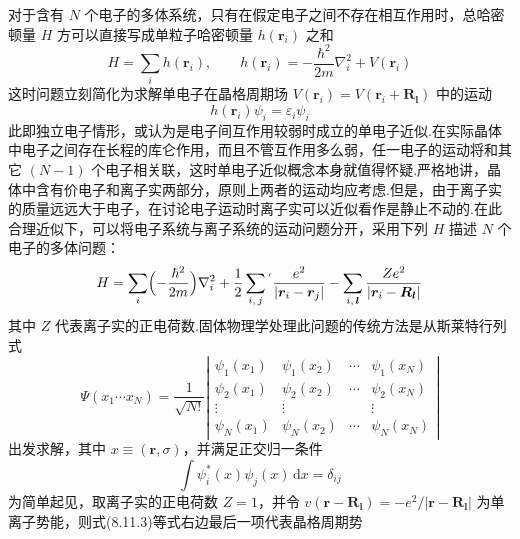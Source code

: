 对于含有 $N$ 个电子的多体系统，只有在假定电子之间不存在相互作用时，总哈密顿量 $H$ 方可以直接写成单粒子哈密顿量 $h(\boldsymbol{r}_{i})$ 之和
\begin{equation}
  H=\sum_{i}h(\boldsymbol{r}_{i}),\qquad
  h(\boldsymbol{r}_{i})=-\frac{\hbar^{2}}{2m}\nabla_{i}^{2}+V(\boldsymbol{r}_{i})
\end{equation}
这时问题立刻简化为求解单电子在晶格周期场 $V(\boldsymbol{r}_{i})=V(\boldsymbol{r}_{i}+\boldsymbol{R}_{\boldsymbol{l}})$ 中的运动
\begin{equation}
  h(\boldsymbol{r}_{i})\psi_{i}=\varepsilon_{i}\psi_{i}
\end{equation}
此即独立电子情形，或认为是电子间互作用较弱时成立的单电子近似.在实际晶体中电子之间存在长程的库仑作用，而且不管互作用多么弱，任一电子的运动将和其它 $(N-1)$ 个电子相关联，这时单电子近似概念本身就值得怀疑.严格地讲，晶体中含有价电子和离子实两部分，原则上两者的运动均应考虑.但是，由于离子实的质量远远大于电子，在讨论电子运动时离子实可以近似看作是静止不动的.在此合理近似下，可以将电子系统与离子系统的运动问题分开，采用下列 $H$ 描述 $N$ 个电子的多体问题：
\begin{equation}
  H=\sum_{i}\Bigl(-\frac{\hbar^{2}}{2m}\Bigr)\nabla_{i}^{2}
  +\frac{1}{2}\sum_{i,\,j}{}^{'}\frac{e^{2}}{|\boldsymbol{r}_{i}-\boldsymbol{r}_{j}|}
  -\sum_{i,\,\boldsymbol{l}}\frac{Ze^{2}}{|\boldsymbol{r}_{i}-\boldsymbol{R}_{\boldsymbol{l}}|}
\end{equation}
其中 $Z$ 代表离子实的正电荷数.固体物理学处理此问题的传统方法是从斯莱特行列式
\begin{equation}
  \Psi(x_{1}\cdots x_{N})=\frac{1}{\sqrt{N!}}
  \left|\begin{array}{cccc}
    \psi_{1}(x_{1}) & \psi_{1}(x_{2}) & \cdots & \psi_{1}(x_{N})\\
    \psi_{2}(x_{1}) & \psi_{2}(x_{2}) & \cdots & \psi_{2}(x_{N})\\
    \vdots & \vdots & & \vdots\\
    \psi_{N}(x_{1}) & \psi_{N}(x_{2}) & \cdots & \psi_{N}(x_{N})
  \end{array}\right|
\end{equation}
出发求解，其中 $x\equiv(\boldsymbol{r},\sigma)$，并满足正交归一条件
\begin{equation}
  \int\psi_{i}^{*}(x)\psi_{j}(x)\,\mathrm{d}x=\delta_{ij}
\end{equation}
为简单起见，取离子实的正电荷数 $Z=1$，并令 $v(\boldsymbol{r}-\boldsymbol{R}_{\boldsymbol{l}})=-e^{2}/|\boldsymbol{r}-\boldsymbol{R}_{\boldsymbol{l}}|$ 为单离子势能，则式(8.11.3)等式右边最后一项代表晶格周期势
